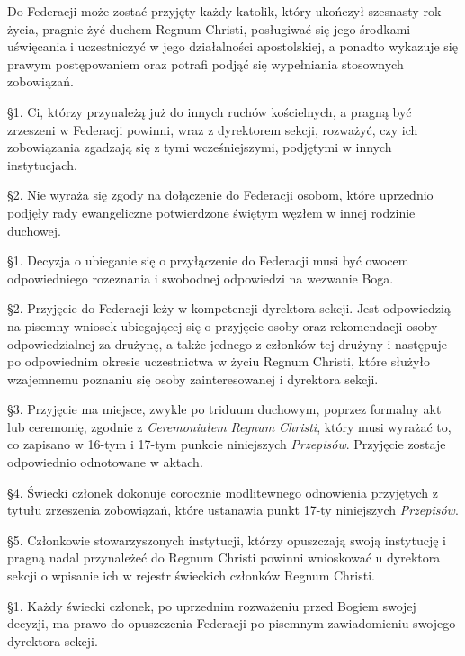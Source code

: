 
 Do Federacji może zostać przyjęty każdy katolik, który ukończył szesnasty rok życia, pragnie żyć duchem Regnum Christi, posługiwać się jego środkami uświęcania i uczestniczyć w jego działalności apostolskiej, a ponadto wykazuje się prawym postępowaniem oraz potrafi podjąć się wypełniania stosownych zobowiązań.


 \S{}1. Ci, którzy przynależą już do innych ruchów kościelnych, a pragną być zrzeszeni w Federacji powinni, wraz z dyrektorem sekcji, rozważyć, czy ich zobowiązania zgadzają się z tymi wcześniejszymi, podjętymi w innych instytucjach.

\S{}2. Nie wyraża się zgody na dołączenie do Federacji osobom, które uprzednio podjęły rady ewangeliczne potwierdzone świętym węzłem w innej rodzinie duchowej.


 \S{}1. Decyzja o ubieganie się o przyłączenie do Federacji musi być owocem odpowiedniego rozeznania i swobodnej odpowiedzi na wezwanie Boga.

\S{}2. Przyjęcie do Federacji leży w kompetencji dyrektora sekcji. Jest odpowiedzią na pisemny wniosek ubiegającej się o przyjęcie osoby oraz rekomendacji osoby odpowiedzialnej za drużynę, a także jednego z członków tej drużyny i następuje po odpowiednim okresie uczestnictwa w życiu Regnum Christi, które służyło wzajemnemu poznaniu się osoby zainteresowanej i dyrektora sekcji.

\S{}3. Przyjęcie ma miejsce, zwykle po triduum duchowym, poprzez formalny akt lub ceremonię, zgodnie z {\em Ceremoniałem Regnum Christi}, który musi wyrażać to, co zapisano w 16-tym i 17-tym punkcie niniejszych {\em Przepisów}. Przyjęcie zostaje odpowiednio odnotowane w aktach.

\S{}4. Świecki członek dokonuje corocznie modlitewnego odnowienia przyjętych z tytułu zrzeszenia zobowiązań, które ustanawia punkt 17-ty niniejszych {\em Przepisów}.

\S{}5. Członkowie stowarzyszonych instytucji, którzy opuszczają swoją instytucję i pragną nadal przynależeć do Regnum Christi powinni wnioskować u dyrektora sekcji o wpisanie ich w rejestr świeckich członków Regnum Christi.


 \S{}1. Każdy świecki członek, po uprzednim rozważeniu przed Bogiem swojej decyzji, ma prawo do opuszczenia Federacji po pisemnym zawiadomieniu swojego dyrektora sekcji.


